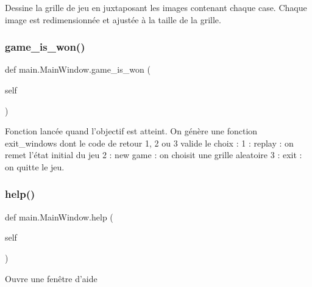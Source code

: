 \begin{DoxyVerb}Dessine la grille de jeu en juxtaposant les images contenant chaque case. Chaque image est redimensionnée et ajustée à la taille de la grille.
\end{DoxyVerb}
 \mbox{\label{classmain_1_1MainWindow_aa3f0bb9335d7040e1b09e1bd4c9352b8}} 
\subsubsection{\texorpdfstring{game\+\_\+is\+\_\+won()}{game\_is\_won()}}
{\footnotesize\ttfamily def main.\+Main\+Window.\+game\+\_\+is\+\_\+won (\begin{DoxyParamCaption}\item[{}]{self }\end{DoxyParamCaption})}

\begin{DoxyVerb}Fonction lancée quand l'objectif est atteint. On génère une fonction exit_windows dont le code de retour 1, 2 ou 3 valide le choix :
1 : replay : on remet l'état initial du jeu
2 : new game : on choisit une grille aleatoire
3 : exit : on quitte le jeu.
\end{DoxyVerb}
 \mbox{\label{classmain_1_1MainWindow_afd6674a5ffab5505719cf020fd430ce0}} 
\subsubsection{\texorpdfstring{help()}{help()}}
{\footnotesize\ttfamily def main.\+Main\+Window.\+help (\begin{DoxyParamCaption}\item[{}]{self }\end{DoxyParamCaption})}

\begin{DoxyVerb}Ouvre une fenêtre d'aide\end{DoxyVerb}
 \mbox{\label{classmain_1_1MainWindow_a26dc40b9b5d9e0327b0f593850746448}} 
